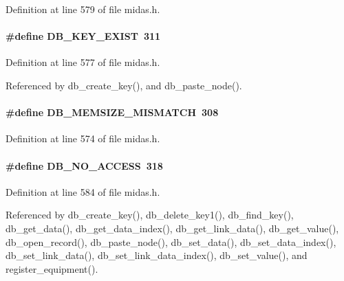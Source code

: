 Definition at line 579 of file midas.h.
\paragraph[{DB\_\-KEY\_\-EXIST}]{\setlength{\rightskip}{0pt plus 5cm}\#define DB\_\-KEY\_\-EXIST~311}\hfill\label{group__err23_ga2989be8053dffcaf9f4e60ce677e98d3}

\begin{DoxyItemize}
\item 
\end{DoxyItemize}

Definition at line 577 of file midas.h.

Referenced by db\_\-create\_\-key(), and db\_\-paste\_\-node().
\paragraph[{DB\_\-MEMSIZE\_\-MISMATCH}]{\setlength{\rightskip}{0pt plus 5cm}\#define DB\_\-MEMSIZE\_\-MISMATCH~308}\hfill\label{group__err23_ga30ce4ec4017c1d210d2b72497aad6835}

\begin{DoxyItemize}
\item 
\end{DoxyItemize}

Definition at line 574 of file midas.h.
\paragraph[{DB\_\-NO\_\-ACCESS}]{\setlength{\rightskip}{0pt plus 5cm}\#define DB\_\-NO\_\-ACCESS~318}\hfill\label{group__err23_ga467b0af34b1011481919088b6af86b95}

\begin{DoxyItemize}
\item 
\end{DoxyItemize}

Definition at line 584 of file midas.h.

Referenced by db\_\-create\_\-key(), db\_\-delete\_\-key1(), db\_\-find\_\-key(), db\_\-get\_\-data(), db\_\-get\_\-data\_\-index(), db\_\-get\_\-link\_\-data(), db\_\-get\_\-value(), db\_\-open\_\-record(), db\_\-paste\_\-node(), db\_\-set\_\-data(), db\_\-set\_\-data\_\-index(), db\_\-set\_\-link\_\-data(), db\_\-set\_\-link\_\-data\_\-index(), db\_\-set\_\-value(), and register\_\-equipment().
